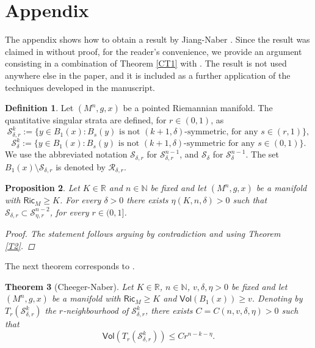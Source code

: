 \documentclass[10pt]{article}
\newtheorem{thm}{Theorem}[section]
\newtheorem{proposition}[thm]{Proposition}
\theoremstyle{definition}
\newtheorem{definition}[thm]{Definition}
\newcommand{\bb}[1]{\mathbb{#1}}
\newcommand{\ssf}[1]{\mathsf{#1}}
\newcommand{\Ric}{\mathsf{Ric}}
\begin{document}
\section*{Appendix}

The appendix shows how to obtain a result by Jiang-Naber \cite[Theorem 2.17]{Naberconjectures}. Since the result was claimed in \cite{Naberconjectures} without proof, for the reader's convenience,  we provide an argument consisting in a combination of   Theorem \ref{CT1}  with \cite[Theorem 1.3]{CheegerNaber}. The result is not used anywhere else in the paper, and it is included as a further application of the techniques developed in the manuscript.

\begin{definition}
    Let $(M^n,g,x)$ be a pointed Riemannian manifold. The quantitative singular strata are defined, for $r \in (0,1)$, as
    \[
    \mathcal{S}_{\delta,r}^k:=\{y \in B_1(x): B_s(y) \text{ is not } (k+1,\delta) \text{-symmetric, for any } s \in (r,1)\},
    \]
    \[
    \mathcal{S}_{\delta}^k:=\{y \in B_1(x): B_s(y) \text{ is not } (k+1,\delta) \text{-symmetric for any } s \in (0,1)\}.
    \]
    We use the abbreviated notation $\mathcal{S}_{\delta,r}$ for $\mathcal{S}^{n-1}_{\delta,r}$, and $\mathcal{S}_{\delta}$ for $\mathcal{S}^{n-1}_{\delta}$. The set $B_1(x) \setminus \mathcal{S}_{\delta,r}$ is denoted by $\mathcal{R}_{\delta,r}$.
\end{definition}

\begin{proposition} \label{P2}
    Let $K \in \bb{R}$ and $n \in \bb{N}$ be fixed and let $(M^n,g,x)$ be a manifold with $\Ric_M \geq K$. For every $\delta>0$ there exists $\eta(K,n,\delta)>0$ such that
    $
    \mathcal{S}_{\delta,r} \subset \mathcal{S}^{n-2}_{\eta,r}
    $,
    for every $r \in (0,1]$.
    \begin{proof}
        The statement follows arguing by contradiction and using Theorem \ref{T2}.
    \end{proof}
\end{proposition}

The next theorem corresponds to \cite[Theorem 1.3]{CheegerNaber}.
\begin{thm}[Cheeger-Naber] \label{CheegerNaberMain}
    Let $K \in \bb{R}$, $n \in \bb{N}$, $v,\delta,\eta >0$ be fixed and let $(M^n,g,x)$ be a manifold with $\Ric_M \geq K$ and $\ssf{Vol}(B_1(x)) \geq v$. Denoting by $T_r(\mathcal{S}^k_{\delta,r})$ the $r$-neighbourhood of $\mathcal{S}^k_{\delta,r}$, there exists  $C=C(n,v,\delta,\eta)>0$ such that
    \[
    \ssf{Vol}(T_r(\mathcal{S}^k_{\delta,r})) \leq Cr^{n-k-\eta}.
    \]
\end{thm}
\end{document}
